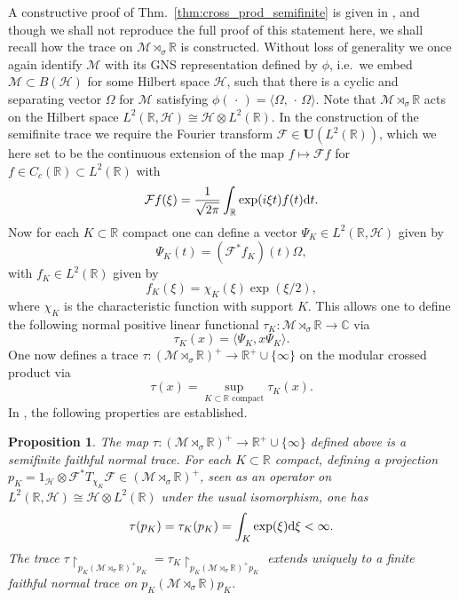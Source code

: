 \documentclass[sn-mathphys-num]{sn-jnl}%
\newcommand{\CC}{\mathbb{C}}
\newcommand{\RR}{\mathbb{R}}
\newcommand{\HH}{\mathcal{H}}
\newcommand{\MM}{\mathcal{M}}
\newcommand{\diff}{\textup{d}}
\numberwithin{equation}{section}
\theoremstyle{thmstyleone}%
\newtheorem{proposition}[theorem]{Proposition}%
\theoremstyle{thmstyletwo}%
\theoremstyle{thmstylethree}%
\begin{document}
A constructive proof of Thm.\ \ref{thm:cross_prod_semifinite} is given in \cite{vanDaele:1978}, and though we shall not reproduce the full proof of this statement here, we shall recall how the trace on $\MM\rtimes_\sigma\RR$ is constructed. Without loss of generality we once again identify $\MM$ with its GNS representation  defined by $\phi$, i.e.\ we embed $\MM \subset B(\HH)$ for some Hilbert space $\HH$, such that there is a cyclic and separating vector $\Omega$ for $\MM$ satisfying $\phi(\,\cdot\,)=\langle\Omega,\,\cdot\,\Omega\rangle$. Note that $\MM\rtimes_\sigma \RR$ acts on the Hilbert space $L^2(\RR,\HH)\cong\HH\otimes L^2(\RR)$. In the construction of the semifinite trace we require the Fourier transform $\mathcal{F}\in\mathbf{U}(L^2(\RR))$, which we here set to be the continuous extension of the map $f\mapsto \mathcal{F}f$ for $f\in C_c(\RR)\subset L^2(\RR)$ with
    \begin{equation}
        \mathcal{F}f(\xi)=\frac{1}{\sqrt{2\pi}}\int_\RR \exp(i\xi t)f(t)\diff t.
    \end{equation}
Now for each $K\subset \RR$ compact one can define a vector $\Psi_K\in L^2(\RR,\HH)$ given by
\begin{equation}
    \label{eq:psyK}
    \Psi_K(t)=(\mathcal{F}^*f_K)(t)\Omega,
\end{equation}
with $f_K\in L^2(\RR)$ given by
\begin{equation}
    f_K(\xi)=\chi_K(\xi)\exp(\xi/2),
\end{equation}
where $\chi_K$ is the characteristic function with support $K$. This allows one to define the following normal positive linear functional $\tau_K:\MM\rtimes_\sigma \RR\to\CC$ via
\begin{equation}
    \tau_K(x)=\langle\Psi_K,x\Psi_K\rangle.
\end{equation}
One now defines a trace $\tau:(\MM\rtimes_{\sigma}\RR)^+\to\RR^+\cup\{\infty\}$ on the modular crossed product via
    \begin{equation}
    \label{eq:modular_trace}
        \tau(x)=\sup_{K\subset\RR\text{ compact}}\tau_K(x).
    \end{equation}
In \cite{vanDaele:1978}, the following properties are established.  
\begin{proposition}
    \label{prop:modular_trace}
    The map $\tau:(\MM\rtimes_{\sigma}\RR)^+\to\RR^+\cup\{\infty\}$ defined above is a semifinite faithful normal trace. For each $K\subset \RR$ compact, defining a projection $p_K=1_{\HH}\otimes \mathcal{F}^*T_{\chi_K}\mathcal{F}\in (\MM\rtimes_{\sigma}\RR)^+$, seen as an operator on $L^2(\RR,\HH)\cong \HH\otimes L^2(\RR)$ under the usual isomorphism, one has
    \begin{equation}
        \label{eq:finite_trace}\tau(p_K)=\tau_K(p_K)=\int_K\exp(\xi)\diff \xi<\infty.
    \end{equation}
    The trace $\tau\restriction_{p_K(\MM\rtimes_{\sigma}\RR)^+p_K}=\tau_K\restriction_{p_K(\MM\rtimes_{\sigma}\RR)^+p_K}$ extends uniquely to a finite faithful normal trace on $p_K(\MM\rtimes_{\sigma}\RR)p_K$.
\end{proposition}
\end{document}
